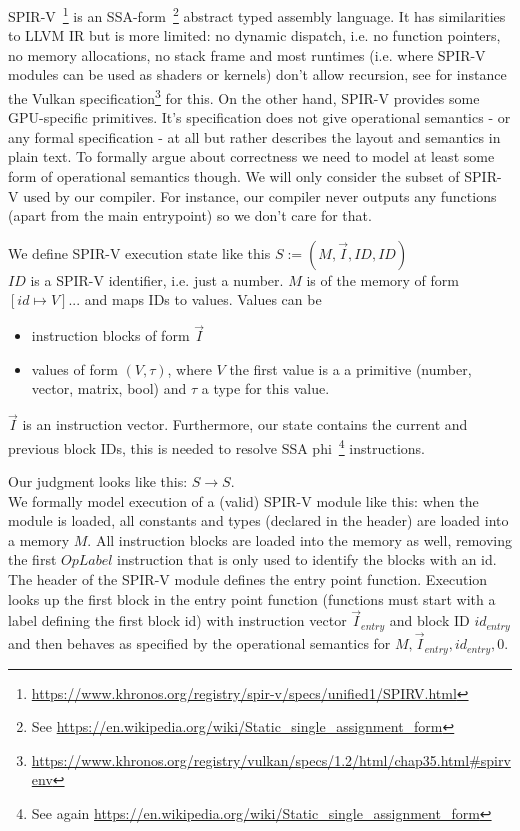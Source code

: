 \documentclass[letterpaper,12pt]{article}
\newcommand{\vi}{\vec{I}}
\begin{document}
SPIR-V~\footnote{\url{https://www.khronos.org/registry/spir-v/specs/unified1/SPIRV.html}}
is an SSA-form~\footnote{See \url{https://en.wikipedia.org/wiki/Static_single_assignment_form}}
abstract typed assembly language. It has
similarities to LLVM IR but is more limited: no dynamic dispatch,
i.e. no function pointers, no memory allocations, no stack frame and
most runtimes (i.e. where SPIR-V modules can be used as shaders or
kernels) don't allow recursion, see for instance the Vulkan 
specification\footnote{\url{https://www.khronos.org/registry/vulkan/specs/1.2/html/chap35.html\#spirvenv}}
for this. On the other hand, SPIR-V provides some 
GPU-specific primitives.
It's specification does not give operational semantics - or 
any formal specification - at all but rather describes the layout 
and semantics in plain text. To formally argue about correctness we need 
to model at least some form of operational semantics though. We will
only consider the subset of SPIR-V used by our compiler.
For instance, our compiler never outputs any functions (apart from the
main entrypoint) so we don't care for that.

We define SPIR-V execution state like this $S := (M, \vi, ID, ID)$ \\
$ID$ is a SPIR-V identifier, i.e. just a number.
$M$ is of the memory of form $[id \mapsto V] ... $ and maps IDs to values. Values can be 
\begin{itemize}
	\item instruction blocks of form $\vi$
	\item values of form $(V, \tau)$, where $V$ the first value is a
		a primitive (number, vector, matrix, bool) and $\tau$
		a type for this value.
\end{itemize}
$\vi$ is an instruction vector.
Furthermore, our state contains the current and previous block IDs,
this is needed to resolve SSA phi~\footnote{See again \url{https://en.wikipedia.org/wiki/Static_single_assignment_form}}
instructions.

Our judgment looks like this: $S \rightarrow S$. \\

We formally model execution of a (valid) SPIR-V module like this: when the module
is loaded, all constants and types (declared in the header) are loaded
into a memory $M$. All instruction blocks are loaded into the memory as well,
removing the first $OpLabel$ instruction that is only used to identify
the blocks with an id.
The header of the SPIR-V module defines the entry point function.
Execution looks up the first block in the entry point function (functions must 
start with a label defining the first block id) with instruction 
vector $\vi_{entry}$ and block ID $id_{entry}$ and 
then behaves as specified by the operational semantics
for $M, \vi_{entry}, id_{entry}, 0$.
\end{document}
